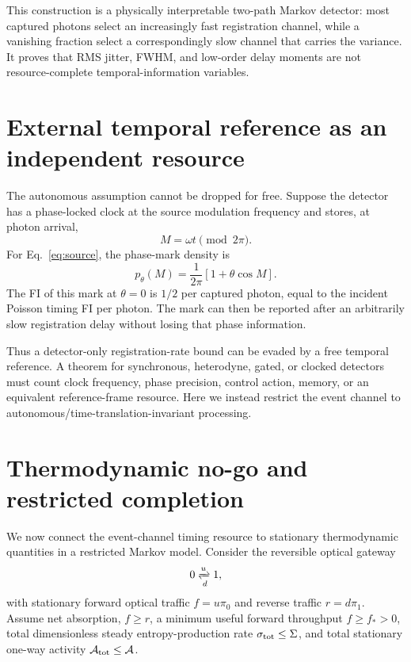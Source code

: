 \documentclass[aps,prapplied,preprint,nofootinbib]{revtex4-2}
\begin{document}
This construction is a physically interpretable two-path Markov detector: most captured photons select an increasingly fast registration channel, while a vanishing fraction select a correspondingly slow channel that carries the variance.  It proves that RMS jitter, FWHM, and low-order delay moments are not resource-complete temporal-information variables.

\section{External temporal reference as an independent resource}
\label{sec:clock}

The autonomous assumption cannot be dropped for free.  Suppose the detector has a phase-locked clock at the source modulation frequency and stores, at photon arrival,
\begin{equation}
M=\omega t\pmod{2\pi}.
\end{equation}
For Eq.~\eqref{eq:source}, the phase-mark density is
\begin{equation}
p_\theta(M)=\frac{1}{2\pi}[1+\theta\cos M].
\end{equation}
The FI of this mark at $\theta=0$ is $1/2$ per captured photon, equal to the incident Poisson timing FI per photon.  The mark can then be reported after an arbitrarily slow registration delay without losing that phase information.

Thus a detector-only registration-rate bound can be evaded by a free temporal reference.  A theorem for synchronous, heterodyne, gated, or clocked detectors must count clock frequency, phase precision, control action, memory, or an equivalent reference-frame resource.  Here we instead restrict the event channel to autonomous/time-translation-invariant processing.

\section{Thermodynamic no-go and restricted completion}
\label{sec:thermo}

We now connect the event-channel timing resource to stationary thermodynamic quantities in a restricted Markov model.  Consider the reversible optical gateway
\begin{equation}
0\xrightleftharpoons[d]{u}1,
\label{eq:gateway}
\end{equation}
with stationary forward optical traffic $f=u\pi_0$ and reverse traffic $r=d\pi_1$.  Assume net absorption, $f\ge r$, a minimum useful forward throughput $f\ge f_*>0$, total dimensionless steady entropy-production rate $\sigma_{\rm tot}\le\Sigma$, and total stationary one-way activity $\mathcal A_{\rm tot}\le\mathcal A$.
\end{document}
